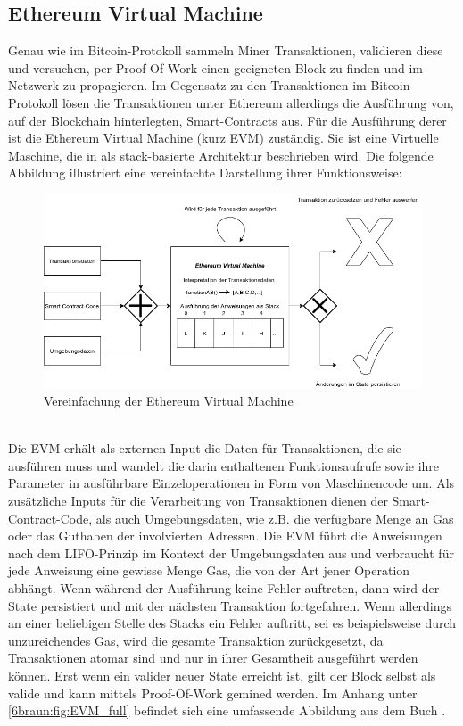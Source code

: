 \subsection{Ethereum Virtual Machine}
Genau wie im Bitcoin-Protokoll sammeln Miner Transaktionen, validieren diese und versuchen, per Proof-Of-Work einen geeigneten Block zu finden und im Netzwerk zu propagieren. 
Im Gegensatz zu den Transaktionen im Bitcoin-Protokoll lösen die Transaktionen unter Ethereum allerdings die Ausführung von, auf der Blockchain hinterlegten, Smart-Contracts aus. 
Für die Ausführung derer ist die Ethereum Virtual Machine (kurz EVM) zuständig. 
Sie ist eine Virtuelle Maschine, die in  \cite{wood_yellowpaper_2014} als stack-basierte Architektur beschrieben wird. 
Die folgende Abbildung illustriert eine vereinfachte Darstellung ihrer Funktionsweise: 
\begin{figure}[htpb]
	\centering
	\includegraphics[width=\textwidth]{images/evm_simple.png}
	\caption{Vereinfachung der Ethereum Virtual Machine}
	\label{6braun:fig:evm_simple}
\end{figure}\\

Die EVM erhält als externen Input die Daten für Transaktionen, die sie ausführen muss und wandelt die darin enthaltenen Funktionsaufrufe sowie ihre Parameter in ausführbare Einzeloperationen in Form von Maschinencode um. 
Als zusätzliche Inputs für die Verarbeitung von Transaktionen dienen der Smart-Contract-Code, als auch Umgebungsdaten, wie z.B. die verfügbare Menge an Gas oder das Guthaben der involvierten Adressen. 
Die EVM führt die Anweisungen nach dem LIFO-Prinzip im Kontext der Umgebungsdaten aus und verbraucht für jede Anweisung eine gewisse Menge Gas, die von der Art jener Operation abhängt. Wenn während der Ausführung keine Fehler auftreten, dann wird der State persistiert und mit der nächsten Transaktion fortgefahren. 
Wenn allerdings an einer beliebigen Stelle des Stacks ein Fehler auftritt, sei es beispielsweise durch unzureichendes Gas, wird die gesamte Transaktion zurückgesetzt, da Transaktionen atomar sind und nur in ihrer Gesamtheit ausgeführt werden können. Erst wenn ein valider neuer State erreicht ist, gilt der Block selbst als valide und kann mittels Proof-Of-Work gemined werden. Im Anhang unter \ref{6braun:fig:EVM_full} befindet sich eine umfassende Abbildung aus dem Buch \cite{antanopoulos_2018}.
